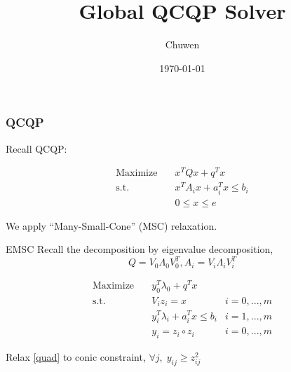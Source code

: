 
\usepackage{subfig}
\usepackage[style=verbose]{biblatex}
\usepackage{bm}
\title{Global QCQP Solver}
\author{Chuwen}
\date{\today}




\fontsize{10pt}{11.2}\selectfont
\frame{\titlepage}



\begin{frame}
  \frametitle{QCQP}
  Recall QCQP:

  \begin{equation}
    \begin{aligned}
      \mathrm{Maximize}\quad & x^TQx + q^T x                   \\
      \mathrm{s.t.}  \quad   & x^{T} A_i x  + a_i^Tx   \le b_i \\
                             & 0\le x\le e
    \end{aligned}
  \end{equation}

  We apply ``Many-Small-Cone'' (MSC) relaxation.
\end{frame}


\begin{frame}{EMSC}
  Recall the decomposition by eigenvalue decomposition,
  \[Q = V_0\Lambda_0 V_0 ^T, A_i = V_i\Lambda_i V_i^T \]

  \begin{align}
    \nonumber \mathrm{Maximize}\quad & y_0 ^T\lambda_0 + q^Tx                         \\
    \mathrm{s.t.} \quad              & V_i z_i = x                        & i=0,...,m \\
                                     & y_i ^T\lambda_i  + a_i^Tx  \le b_i & i=1,...,m \\
    \label{quad}                     & y_i = z_i \circ z_i                & i=0,...,m
  \end{align}

  Relax \eqref{quad} to conic constraint, \(\forall j, \; y_{ij} \ge z^2_{ij}\)
\end{frame}



